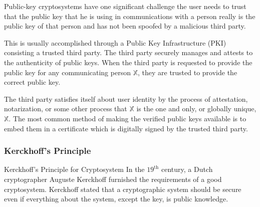 \documentclass[british]{article}
\begin{document}
Public-key cryptosystems have one significant challenge \textminus{}
the user needs to trust that the public key that he is using in communications
with a person really is the public key of that person and has not
been spoofed by a malicious third party.

This is usually accomplished through a Public Key Infrastructure (PKI)
consisting a trusted third party. The third party securely manages
and attests to the authenticity of public keys. When the third party
is requested to provide the public key for any communicating person
$\mathbb{X}$, they are trusted to provide the correct public key.

The third party satisfies itself about user identity by the process
of attestation, notarization, or some other process \textminus{} that
$\mathbb{X}$ is the one and only, or globally unique, $\mathbb{X}$.
The most common method of making the verified public keys available
is to embed them in a certificate which is digitally signed by the
trusted third party.

\subsubsection{Kerckhoff\textquoteright s Principle}

Kerckhoff's Principle for Cryptosystem In the $19^{\text{th}}$ century,
a Dutch cryptographer Auguste Kerckhoff furnished the requirements
of a good cryptosystem. Kerckhoff stated that a cryptographic system
should be secure even if everything about the system, except the key,
is public knowledge.
\end{document}
